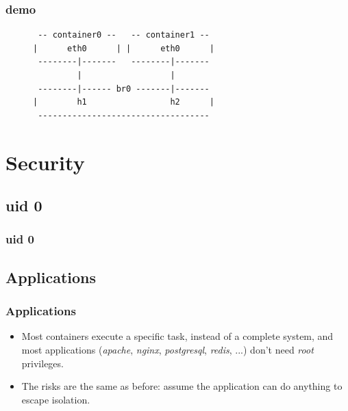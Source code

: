\documentclass{beamer}
\begin{document}
\begin{frame}[fragile]
    \frametitle{demo}
    \begin{figure}
        \centering
        \begin{varwidth}{\linewidth}
            \begin{verbatim}
 -- container0 --   -- container1 --
|      eth0      | |      eth0      |
 --------|-------   --------|-------
         |                  |
 --------|------ br0 -------|-------
|        h1                 h2      |
 -----------------------------------
            \end{verbatim}
        \end{varwidth}
    \end{figure}
\end{frame}

\section{Security}

\subsection{uid 0}

\begin{frame}
    \frametitle{uid 0}
\end{frame}

\subsection{Applications}

\begin{frame}
    \frametitle{Applications}
    \begin{itemize}
        \item
            Most containers execute a specific task, instead of a complete
            system, and most applications (\textit{apache}, \textit{nginx},
            \textit{postgresql}, \textit{redis}, ...) don't need \textit{root}
            privileges.
        \item
            The risks are the same as before: assume the application can do
            anything to escape isolation.
    \end{itemize}
\end{frame}
\end{document}
